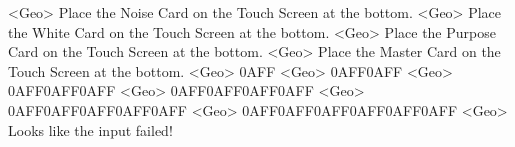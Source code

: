 <Geo> Place the Noise Card on the Touch Screen at the bottom.
<Geo> Place the White Card on the Touch Screen at the bottom.
<Geo> Place the Purpose Card on the Touch Screen at the bottom.
<Geo> Place the Master Card on the Touch Screen at the bottom.
<Geo> {0A}{FF}
<Geo> {0A}{FF}{0A}{FF}
<Geo> {0A}{FF}{0A}{FF}{0A}{FF}
<Geo> {0A}{FF}{0A}{FF}{0A}{FF}{0A}{FF}
<Geo> {0A}{FF}{0A}{FF}{0A}{FF}{0A}{FF}{0A}{FF}
<Geo> {0A}{FF}{0A}{FF}{0A}{FF}{0A}{FF}{0A}{FF}{0A}{FF}
<Geo> Looks like the input failed!
